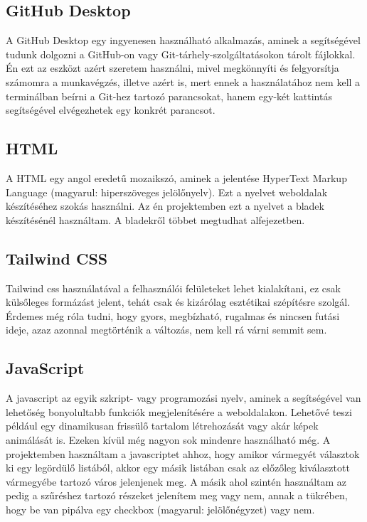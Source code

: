 \documentclass[]{thesis-ekf}
\theoremstyle{definition}
\theoremstyle{remark}
\begin{document}
	\subsection{GitHub Desktop}
		A GitHub Desktop egy ingyenesen használható alkalmazás, aminek a segítségével tudunk dolgozni a GitHub-on vagy Git-tárhely-szolgáltatásokon tárolt fájlokkal. Én ezt az eszközt azért szeretem használni, mivel megkönnyíti és felgyorsítja számomra a munkavégzés, illetve azért is, mert ennek a használatához nem kell a terminálban beírni a Git-hez tartozó parancsokat, hanem egy-két kattintás segítségével elvégezhetek egy konkrét parancsot.
		\cite{GitHubDesktop}
	\subsection{HTML}
		A HTML egy angol eredetű mozaikszó, aminek a jelentése HyperText Markup Language (magyarul: hiperszöveges jelölőnyelv). Ezt a nyelvet weboldalak készítéséhez szokás használni. Az én projektemben ezt a nyelvet a bladek készítésénél használtam. A bladekről többet megtudhat  alfejezetben.   
	\subsection{Tailwind CSS}\label{sc-tailwind}
		Tailwind css használatával a felhasználói felületeket lehet kialakítani, ez csak külsőleges formázást jelent, tehát csak és kizárólag esztétikai szépítésre szolgál. Érdemes még róla tudni, hogy gyors, megbízható, rugalmas és nincsen futási ideje, azaz azonnal megtörténik a változás, nem kell rá várni semmit sem. \cite{tailwind}
	\subsection{JavaScript}\label{javascript}
		A javascript az egyik szkript- vagy programozási nyelv, aminek a segítségével van lehetőség bonyolultabb funkciók megjelenítésére a weboldalakon. Lehetővé teszi például egy dinamikusan frissülő tartalom létrehozását vagy akár képek animálását is. Ezeken kívül még nagyon sok mindenre használható még. A projektemben használtam a javascriptet ahhoz, hogy amikor vármegyét választok ki egy legördülő listából, akkor egy másik listában csak az előzőleg kiválasztott vármegyébe tartozó város jelenjenek meg. A másik ahol szintén használtam az pedig a szűréshez tartozó részeket jelenítem meg vagy nem, annak a tükrében, hogy be van pipálva egy checkbox (magyarul: jelölőnégyzet) vagy nem.
\end{document}

